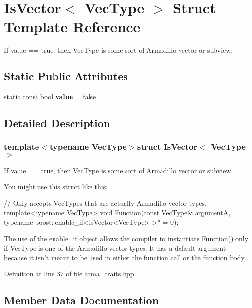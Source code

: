 \section{Is\-Vector$<$ Vec\-Type $>$ Struct Template Reference}
\label{structIsVector}


If value == true, then Vec\-Type is some sort of Armadillo vector or subview.  


\subsection*{Static Public Attributes}
\begin{DoxyCompactItemize}
\item 
static const bool {\bf value} = false
\end{DoxyCompactItemize}


\subsection{Detailed Description}
\subsubsection*{template$<$typename Vec\-Type$>$struct Is\-Vector$<$ Vec\-Type $>$}

If value == true, then Vec\-Type is some sort of Armadillo vector or subview. 

You might use this struct like this\-:


\begin{DoxyCode}
\textcolor{comment}{// Only accepts VecTypes that are actually Armadillo vector types.}
\textcolor{keyword}{template}<\textcolor{keyword}{typename} VecType>
\textcolor{keywordtype}{void} Function(\textcolor{keyword}{const} VecType& argumentA,
              \textcolor{keyword}{typename} boost::enable\_if<IsVector<VecType> >* = 0);
\end{DoxyCode}


The use of the enable\-\_\-if object allows the compiler to instantiate Function() only if Vec\-Type is one of the Armadillo vector types. It has a default argument because it isn't meant to be used in either the function call or the function body. 

Definition at line 37 of file arma\-\_\-traits.\-hpp.



\subsection{Member Data Documentation}
